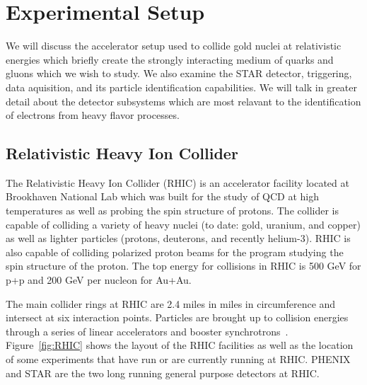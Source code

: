 \chapter{Experimental Setup}

We will discuss the accelerator setup used to collide gold nuclei at relativistic energies which briefly create the strongly interacting medium of quarks and gluons which we wish to study. We also examine the STAR detector, triggering, data aquisition, and its particle identification capabilities. We will talk in greater detail about the detector subsystems which are most relavant to the identification of electrons from heavy flavor processes. 

\section{Relativistic Heavy Ion Collider}

The Relativistic Heavy Ion Collider (RHIC) is an accelerator facility located at Brookhaven National Lab which was built for the study of QCD at high temperatures as well as probing the spin structure of protons. The collider is capable of colliding a variety of heavy nuclei (to date: gold, uranium, and copper) as well as lighter particles (protons, deuterons, and recently helium-3). RHIC is also capable of colliding polarized proton beams for the program studying the spin structure of the proton. The top energy for collisions in RHIC is 500 GeV for p+p and 200 GeV per nucleon for Au+Au. 

The main collider rings at RHIC are 2.4 miles in miles in circumference and intersect at six interaction points. Particles are brought up to collision energies through a series of linear accelerators and booster synchrotrons~\cite{RHICacc}. Figure~\ref{fig:RHIC} shows the layout of the RHIC facilities as well as the location of some experiments that have run or are currently running at RHIC. PHENIX and STAR are the two long running general purpose detectors at RHIC.


